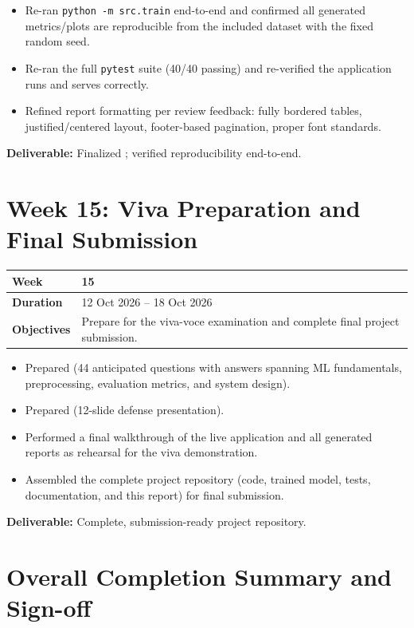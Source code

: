 \documentclass[12pt,a4paper]{report}
\newcommand{\weektable}[3]{%
\begin{longtable}{|p{3.6cm}|p{10.5cm}|}
\hline
\textbf{Week} & \textbf{#1} \\
\hline
\textbf{Duration} & #2 \\
\hline
\textbf{Objectives} & #3 \\
\hline
\end{longtable}
}
\begin{document}
\begin{itemize}[nosep]
    \item Re-ran \texttt{python -m src.train} end-to-end and confirmed all generated metrics/plots are reproducible from the included dataset with the fixed random seed.
    \item Re-ran the full \texttt{pytest} suite (40/40 passing) and re-verified the application runs and serves correctly.
    \item Refined report formatting per review feedback: fully bordered tables, justified/centered layout, footer-based pagination, proper font standards.
\end{itemize}
\textbf{Deliverable:} Finalized ; verified reproducibility end-to-end.

\chapter{Week 15: Viva Preparation and Final Submission}
\weektable{15}{12 Oct 2026 -- 18 Oct 2026}{Prepare for the viva-voce examination and complete final project submission.}

\begin{itemize}[nosep]
    \item Prepared  (44 anticipated questions with answers spanning ML fundamentals, preprocessing, evaluation metrics, and system design).
    \item Prepared  (12-slide defense presentation).
    \item Performed a final walkthrough of the live application and all generated reports as rehearsal for the viva demonstration.
    \item Assembled the complete project repository (code, trained model, tests, documentation, and this report) for final submission.
\end{itemize}
\textbf{Deliverable:} Complete, submission-ready project repository.

\chapter*{Overall Completion Summary and Sign-off}
\end{document}
